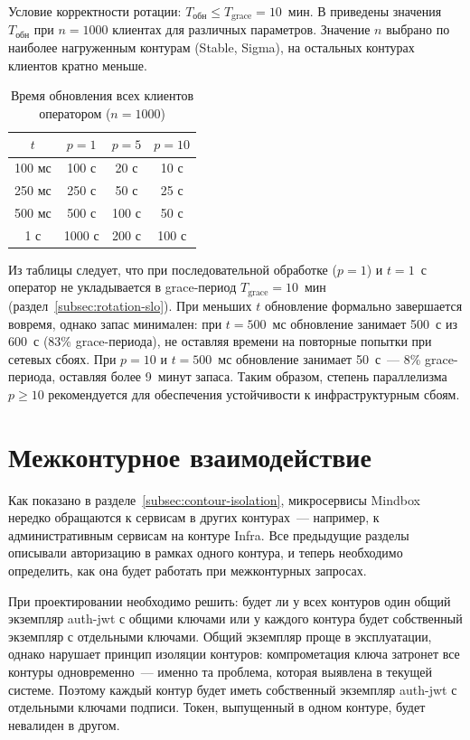 Условие корректности ротации: $T_{\text{обн}} \leq T_{\text{grace}} = 10$~мин.
В  приведены значения $T_{\text{обн}}$
при $n = 1000$ клиентах для различных параметров.
Значение $n$ выбрано по наиболее нагруженным контурам (Stable, Sigma),
на остальных контурах клиентов кратно меньше.

\begin{table}[h]
  \centering
  \caption{Время обновления всех клиентов оператором ($n = 1000$)}
  \label{tab:operator-slo}
  \begin{tabular}{c c c c}
    \hline
    $t$ & $p = 1$ & $p = 5$ & $p = 10$ \\
    \hline
    100 мс & 100 с  & 20 с    & 10 с    \\
    250 мс & 250 с  & 50 с    & 25 с    \\
    500 мс & 500 с  & 100 с   & 50 с    \\
    1 с    & 1000 с & 200 с   & 100 с   \\
    \hline
  \end{tabular}
\end{table}

Из таблицы следует, что при последовательной обработке ($p = 1$)
и $t = 1$~с оператор не укладывается
в grace-период $T_{\text{grace}} = 10$~мин
(раздел~\ref{subsec:rotation-slo}).
При меньших $t$ обновление формально завершается вовремя,
однако запас минимален: при $t = 500$~мс
обновление занимает 500~с из 600~с (83\% grace-периода),
не оставляя времени на повторные попытки при сетевых сбоях.
При $p = 10$ и $t = 500$~мс обновление занимает 50~с~---
8\% grace-периода, оставляя более 9~минут запаса.
Таким образом, степень параллелизма $p \geq 10$
рекомендуется для обеспечения устойчивости к инфраструктурным сбоям.

\section{Межконтурное взаимодействие}\label{sec:exchange}

Как показано в разделе~\ref{subsec:contour-isolation},
микросервисы Mindbox нередко обращаются к сервисам в других контурах~---
например, к административным сервисам на контуре Infra.
Все предыдущие разделы описывали авторизацию
в рамках одного контура, и теперь необходимо определить,
как она будет работать при межконтурных запросах.

При проектировании необходимо решить:
будет ли у всех контуров один общий экземпляр auth-jwt с общими ключами
или у каждого контура будет собственный экземпляр с отдельными ключами.
Общий экземпляр проще в эксплуатации,
однако нарушает принцип изоляции контуров:
компрометация ключа затронет все контуры одновременно~---
именно та проблема, которая выявлена в текущей системе.
Поэтому каждый контур будет иметь собственный экземпляр auth-jwt
с отдельными ключами подписи.
Токен, выпущенный в одном контуре, будет невалиден в другом.

